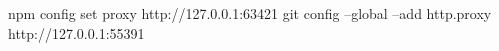 npm config set proxy http://127.0.0.1:63421
git config --global --add http.proxy http://127.0.0.1:55391